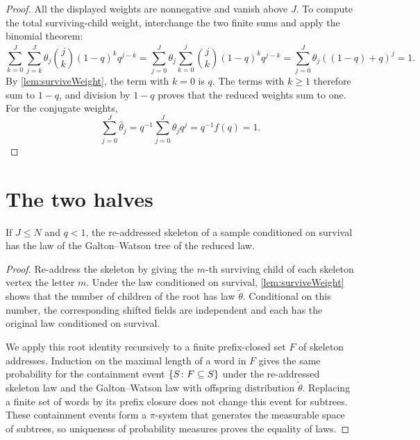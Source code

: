 \begin{proof}
\leanok
All the displayed weights are nonnegative and vanish above $J$. To compute the total
surviving-child weight, interchange the two finite sums and apply the binomial theorem:
\[
  \sum_{k=0}^{J}\sum_{j=k}^{J}
  \theta_j\binom{j}{k}(1-q)^kq^{j-k}
  =\sum_{j=0}^{J}\theta_j\sum_{k=0}^{j}
  \binom{j}{k}(1-q)^kq^{j-k}
  =\sum_{j=0}^{J}\theta_j((1-q)+q)^j=1.
\]
By \cref{lem:surviveWeight}, the term with $k=0$ is $q$. The terms with $k\geq1$
therefore sum to $1-q$, and division by $1-q$ proves that the reduced weights sum to one.
For the conjugate weights,
\[
  \sum_{j=0}^{J}\hat\theta_j=q^{-1}\sum_{j=0}^{J}\theta_jq^j
  =q^{-1}f(q)=1.
\]
\end{proof}

\section{The two halves}

\begin{theorem}
\label{thm:harris-skeleton}
\leanok
If $J\leq N$ and $q<1$, the re-addressed skeleton of a sample conditioned on survival has the
law of the Galton--Watson tree of the reduced law.
\end{theorem}

\begin{proof}
\leanok
Re-address the skeleton by giving the $m$-th surviving child of each skeleton vertex the
letter $m$. Under the law conditioned on survival, \cref{lem:surviveWeight} shows that the
number of children of the root has law $\tilde\theta$. Conditional on this number, the
corresponding shifted fields are independent and each has the original law conditioned on
survival.

We apply this root identity recursively to a finite prefix-closed set $F$ of skeleton
addresses. Induction on the maximal length of a word in $F$ gives the same probability for
the containment event $\{S\colon F\subseteq S\}$ under the re-addressed skeleton law and
the Galton--Watson law with offspring distribution $\tilde\theta$. Replacing a finite set
of words by its prefix closure does not change this event for subtrees. These
containment events form a $\pi$-system that generates the measurable space of subtrees, so
uniqueness of probability measures proves the equality of laws.
\end{proof}

